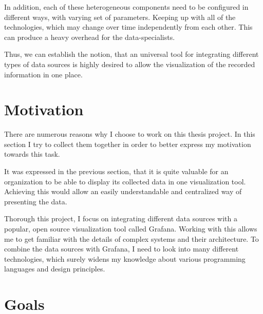 In addition, each of these heterogeneous components need to be configured in different ways, with varying set of parameters. Keeping up with all of the technologies, which may change over time independently from each other. This can produce a heavy overhead for the data-specialists.

Thus, we can establish the notion, that an universal tool for integrating different types of data sources is highly desired to allow the visualization of the recorded information in one place.

\section{Motivation}


There are numerous reasons why I choose to work on this thesis project. In this section I try to collect them together in order to better express my motivation towards this task.

It was expressed in the previous section, that it is quite valuable for an organization to be able to display its collected data in one visualization tool. Achieving this would allow an easily understandable and centralized way of presenting the data.

Thorough this project, I focus on integrating different data sources with a popular, open source visualization tool called Grafana. Working with this allows me to get familiar with the details of complex systems and their architecture. To combine the data sources with Grafana, I need to look into many different technologies, which surely widens my knowledge about various programming languages and design principles.

\section{Goals}

